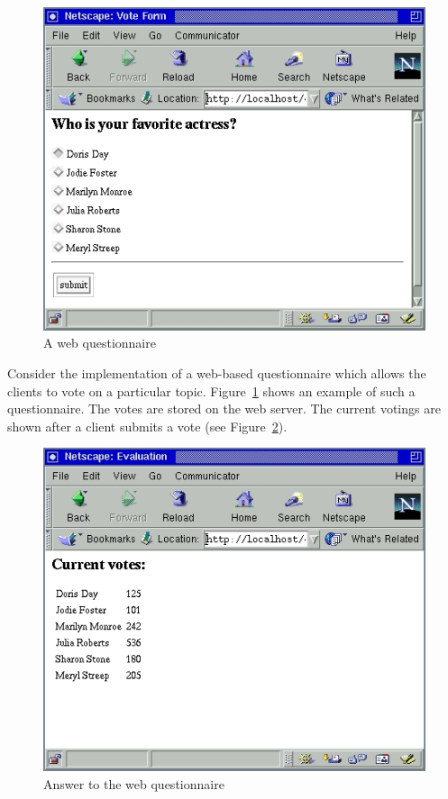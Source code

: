 \begin{figure}[t]
\begin{center}
\includegraphics[scale=0.8]{PICTURES/quest.jpg}
\end{center}\vspace{-3ex}
\caption{A web questionnaire\label{fig-quest}}
\end{figure}

Consider the implementation of a web-based questionnaire
which allows the clients to vote on a particular topic.
Figure~\ref{fig-quest} shows an example of such a questionnaire.
The votes are stored on the web server.
The current votings are shown after a client
submits a vote (see Figure~\ref{fig-quest-answer}).

\begin{figure}[t]
\begin{center}
\includegraphics[scale=0.8]{PICTURES/quest_answer.jpg}
\end{center}\vspace{-3ex}
\caption{Answer to the web questionnaire\label{fig-quest-answer}}
\end{figure}

